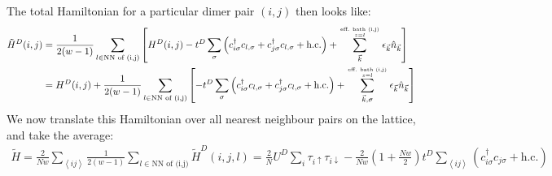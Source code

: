 \documentclass{article}
\numberwithin{equation}{section}
\begin{document}
The total  Hamiltonian for a particular dimer pair \((i,j)\) then looks like:
\begin{equation}\begin{aligned}
	\tilde H^D(i, j) &= \frac{1}{2(w-1)}\sum_{l \in \text{NN of (i,j)}} \left[H^D(i, j) - t^D \sum_{\sigma}\left(c^\dagger_{i\sigma}c_{l,\sigma} + c^\dagger_{j\sigma}c_{l,\sigma} + \text{h.c.}\right) + \sum_{\vec k}^{\text{eff. bath (i,j)}\atop{z = l}}\epsilon_{\vec k}\hat n_{\vec k}\right]\\
			 &= H^D(i, j) + \frac{1}{2(w-1)}\sum_{l \in \text{NN of (i,j)}}\left[- t^D \sum_\sigma\left(c^\dagger_{i\sigma}c_{l,\sigma} + c^\dagger_{j\sigma}c_{l,\sigma} + \text{h.c.}\right) + \sum_{\vec k,\sigma}^{\text{eff. bath (i,j)}\atop{z = l}}\epsilon_{\vec k}\hat n_{\vec k}\right]
\end{aligned}\end{equation}
We now translate this Hamiltonian over all nearest neighbour pairs on the lattice, and take the average:
\begin{equation}\begin{aligned}
	\label{H_tiled}
	\tilde H = \frac{2}{Nw}\sum_{\left<ij\right>}\frac{1}{2(w-1)}\sum_{l \in \text{NN of (i,j)}}\tilde H^D(i, j, l) = \frac{2}{N}U^D\sum_{i} \tau_{i \uparrow}\tau_{i \downarrow} - \frac{2}{Nw}\left(1 + \frac{Nw}{2}\right)t^D\sum_{\left<ij\right>}\left(c^\dagger_{i\sigma}c_{j\sigma} + \text{h.c.}\right)
\end{aligned}\end{equation}
\end{document}
